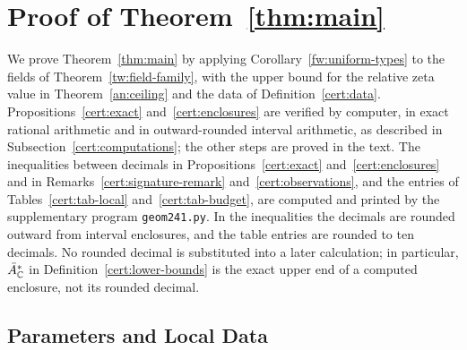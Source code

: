 \section{Proof of Theorem~\ref{thm:main}}
\label{sec:certificate}

We prove Theorem~\ref{thm:main} by applying
Corollary~\ref{fw:uniform-types} to the fields of
Theorem~\ref{tw:field-family}, with the upper bound for the relative
zeta value in Theorem~\ref{an:ceiling} and the data of
Definition~\ref{cert:data}. Propositions~\ref{cert:exact}
and~\ref{cert:enclosures} are verified by computer, in exact rational
arithmetic and in outward-rounded interval arithmetic, as described in
Subsection~\ref{cert:computations}; the other steps are proved in the
text. The inequalities between decimals in
Propositions~\ref{cert:exact} and~\ref{cert:enclosures} and in
Remarks~\ref{cert:signature-remark} and~\ref{cert:observations}, and
the entries of Tables~\ref{cert:tab-local} and~\ref{cert:tab-budget},
are computed and printed by the supplementary program
\texttt{geom241.py}. In the inequalities the decimals are rounded
outward from interval enclosures, and the table entries are rounded to
ten decimals. No rounded decimal is substituted into a later
calculation; in particular, $\bar A_\mathbb C^*$ in
Definition~\ref{cert:lower-bounds} is the exact upper end of a computed
enclosure, not its rounded decimal.

\subsection{Parameters and Local Data}

